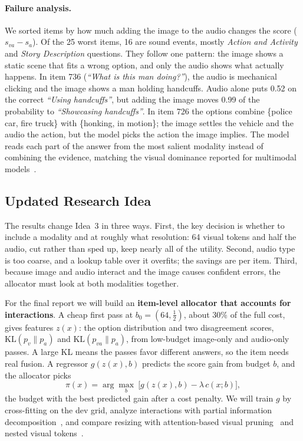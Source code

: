 \documentclass{article}
\begin{document}
\paragraph{Failure analysis.} We sorted items by how much adding the image to the
audio changes the score ($s_{va}-s_a$). Of the 25 worst items, 16 are sound events,
mostly \emph{Action and Activity} and \emph{Story Description} questions. They follow
one pattern: the image shows a static scene that fits a wrong option, and only the
audio shows what actually happens. In item 736 (\emph{``What is this man doing?''}),
the audio is mechanical clicking and the image shows a man holding handcuffs. Audio
alone puts 0.52 on the correct \emph{``Using handcuffs''}, but adding the image moves
0.99 of the probability to \emph{``Showcasing handcuffs''}. In item 726 the options
combine \{police car, fire truck\} with \{honking, in motion\}; the image settles the
vehicle and the audio the action, but the model picks the action the image implies.
The model reads each part of the answer from the most salient modality instead of
combining the evidence, matching the visual dominance reported for multimodal
models~\citep{wu2022greedy,peng2022ogm}.

\subsection{Updated Research Idea}

The results change Idea~3 in three ways. First, the key decision is whether to
include a modality and at roughly what resolution: 64 visual tokens and half the
audio, cut rather than sped up, keep nearly all of the utility. Second, audio type
is too coarse, and a lookup table over it overfits; the savings are per item. Third,
because image and audio interact and the image causes confident errors, the
allocator must look at both modalities together.

For the final report we will build an \textbf{item-level allocator that accounts for
interactions}. A cheap first pass at $b_0=(64,\tfrac12)$, about 30\% of the full
cost, gives features $z(x)$: the option distribution and two disagreement scores,
$\mathrm{KL}(p_v\|p_a)$ and $\mathrm{KL}(p_{va}\|p_a)$, from low-budget image-only and
audio-only passes. A large KL means the passes favor different answers, so the item
needs real fusion. A regressor $g(z(x),b)$ predicts the score gain from budget $b$,
and the allocator picks
\begin{equation}
\pi(x)=\arg\max_{b}\ \big[g(z(x),b)-\lambda\,c(x;b)\big],
\end{equation}
the budget with the best predicted gain after a cost penalty. We will train $g$ by
cross-fitting on the dev grid, analyze interactions with partial information
decomposition~\citep{liang2023pid}, and compare resizing with attention-based visual
pruning~\citep{chen2024fastv} and nested visual tokens~\citep{cai2024matryoshka}.
\end{document}
